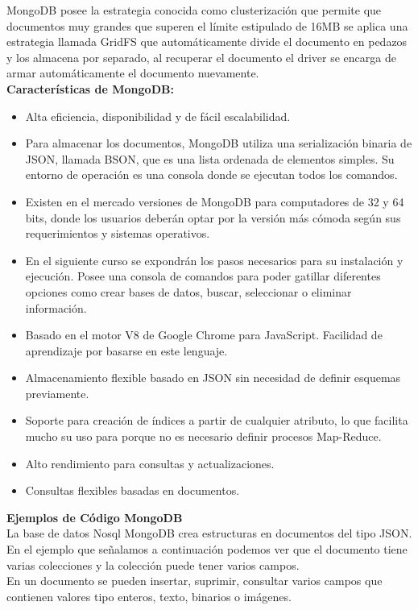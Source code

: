 \documentclass[twoside,twocolumn]{article}
\begin{document}
MongoDB posee la estrategia conocida como clusterización que permite que documentos muy grandes que superen el límite estipulado de 16MB se aplica una estrategia llamada GridFS que automáticamente divide el documento en pedazos y los almacena por separado, al recuperar el documento el driver se encarga de armar automáticamente el documento nuevamente.
\\

\textbf{Características de MongoDB:}\\

\begin{itemize}
    \item Alta eficiencia, disponibilidad y de fácil escalabilidad.
    \item Para almacenar los documentos, MongoDB utiliza una serialización binaria de JSON, llamada BSON, que es una lista ordenada de elementos simples. Su entorno de operación es una consola donde se ejecutan todos los comandos.
    \item Existen en el mercado versiones de MongoDB para computadores de 32 y 64 bits, donde los usuarios deberán optar por la versión más cómoda según sus requerimientos y sistemas operativos.
    \item En el siguiente curso se expondrán los pasos necesarios para su instalación y ejecución. Posee una consola de comandos para poder gatillar diferentes opciones como crear bases de datos, buscar, seleccionar o eliminar información.
    \item Basado en el motor V8 de Google Chrome para JavaScript. Facilidad de aprendizaje por basarse en este lenguaje.
    \item Almacenamiento flexible basado en JSON sin necesidad de definir esquemas previamente.
    \item Soporte para creación de índices a partir de cualquier atributo, lo que facilita mucho su uso para porque no es necesario definir procesos Map-Reduce.
    \item Alto rendimiento para consultas y actualizaciones.
    \item Consultas flexibles basadas en documentos.
\end{itemize}

\textbf{Ejemplos de Código MongoDB}\\
La base de datos Nosql MongoDB crea estructuras en documentos del tipo JSON.\\
En el ejemplo que señalamos a continuación podemos ver que el documento tiene varias colecciones y la colección puede tener varios campos.\\
En un documento se pueden insertar, suprimir, consultar varios campos que contienen valores tipo enteros, texto, binarios o imágenes.\\
\end{document}
